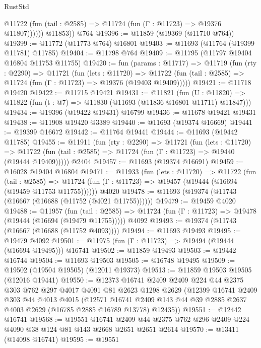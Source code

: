 \begin{lexlean}{RustStd}
\begin{coremodule}
              @11722 (fun (tail : @2585) => @11724 (fun (Γ : @11723) => @19376 @11807))))))
        @11853))
    @764
@19396 := @11859 (@19369 (@11710 @764))
@19399 := @11772 (@11773 @764) @16801
@19403 := @11693 (@11764 (@19399 @11781) @11785)
@19404 := @11798 @764
@19409 := @11795 (@11797 @19404 @16804 @11753 @11755)
@19420 := fun (params : @11717) =>
  @11719
    (fun (rty : @2290) =>
    @11721
      (fun (lets : @11720) =>
      @11722 (fun (tail : @2585) => @11724 (fun (Γ : @11723) => @19376 (@19403 @19409)))))
@19421 := @11718 @19420
@19422 := @11715 @19421
@19431 := @11821
    (fun (U : @11820) => @11822 (fun (t : @7) => @11830 (@11693 (@11836 @16801 @11711) @11847)))
@19434 := @19396 (@19422 @19431) @16799
@19436 := @11678 @19421 @19431
@19438 := @11908 @19420 @3389
@19440 := @11693 (@19374 @16669)
@19441 := @19399 @16672
@19442 := @11764 @19441
@19444 := @11693 (@19442 @11785)
@19455 := @11911
    (fun (rty : @2290) =>
    @11721
      (fun (lets : @11720) =>
      @11722 (fun (tail : @2585) => @11724 (fun (Γ : @11723) => @19440 (@19444 @19409)))))
    @2404
@19457 := @11693 (@19374 @16691)
@19459 := @16028 @19404 @16804
@19471 := @11933
    (fun (lets : @11720) =>
    @11722
      (fun (tail : @2585) =>
      @11724 (fun (Γ : @11723) => @19457 (@19444 (@16694 (@19459 @11753 @11755))))))
    @4020
@19478 := @11693 (@19374 (@11743 (@16667 (@16688 (@11752 (@4021 @11755))))))
@19479 := @19459 @4020
@19488 := @11957
    (fun (tail : @2585) => @11724 (fun (Γ : @11723) => @19478 (@19444 (@16694 (@19479 @11755)))))
    @4092
@19493 := @19374 (@11743 (@16667 (@16688 (@11752 @4093))))
@19494 := @11693 @19493
@19495 := @19479 @4092
@19501 := @11975 (fun (Γ : @11723) => @19494 (@19444 (@16694 @19495))) @16741
@19502 := @11859 @19493
@19503 := @19442 @16744
@19504 := @11693 @19503
@19505 := @16748 @19495
@19509 := @19502 (@19504 @19505) (@12011 @19373)
@19513 := @11859 @19503 @19505 (@12016 @19441)
@19550 := @12373
    @16741
    @2409
    @2409
    @224
    @44
    @2375
    @303
    @762
    @297
    @4017
    @4091
    @81
    @2623
    @1298
    @2629
    (@12399
      @16741
      @2409
      @303
      @44
      @4013
      @4015
      (@12571
        @16741
        @2409
        @143
        @44
        @39
        @2885
        @2637
        @4003
        @2629
        (@16785 @2885 @16789 @13778)
        @12435))
@19551 := @12442 @16741
@19568 := @19551
    @16741
    @2409
    @44
    @2375
    @762
    @296
    @2409
    @224
    @4090
    @38
    @124
    @81
    @143
    @2668
    @2651
    @2651
    @2614
@19570 := @13411 (@14098 @16741)
@19595 := @19551

\end{coremodule}
\end{lexlean}
